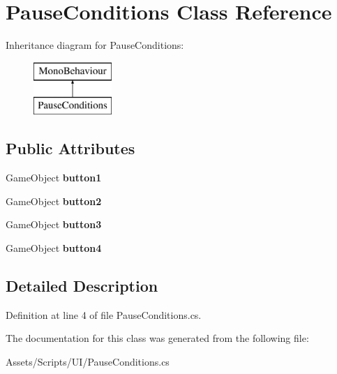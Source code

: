 \hypertarget{class_pause_conditions}{\section{Pause\+Conditions Class Reference}
\label{class_pause_conditions}
}
Inheritance diagram for Pause\+Conditions\+:\begin{figure}[H]
\begin{center}
\leavevmode
\includegraphics[height=2.000000cm]{class_pause_conditions}
\end{center}
\end{figure}
\subsection*{Public Attributes}
\begin{DoxyCompactItemize}
\item 
\hypertarget{class_pause_conditions_a7f54bf5a4189e3d26bbc97a1e2854e63}{Game\+Object {\bfseries button1}}\label{class_pause_conditions_a7f54bf5a4189e3d26bbc97a1e2854e63}

\item 
\hypertarget{class_pause_conditions_a04ca1e5c5090211701027657bb00980d}{Game\+Object {\bfseries button2}}\label{class_pause_conditions_a04ca1e5c5090211701027657bb00980d}

\item 
\hypertarget{class_pause_conditions_abe537000890aabbfa050bfa63890fd13}{Game\+Object {\bfseries button3}}\label{class_pause_conditions_abe537000890aabbfa050bfa63890fd13}

\item 
\hypertarget{class_pause_conditions_a0a07c7c652aedc49d722d046bec5ae4c}{Game\+Object {\bfseries button4}}\label{class_pause_conditions_a0a07c7c652aedc49d722d046bec5ae4c}

\end{DoxyCompactItemize}


\subsection{Detailed Description}


Definition at line 4 of file Pause\+Conditions.\+cs.



The documentation for this class was generated from the following file\+:\begin{DoxyCompactItemize}
\item 
Assets/\+Scripts/\+U\+I/Pause\+Conditions.\+cs\end{DoxyCompactItemize}
